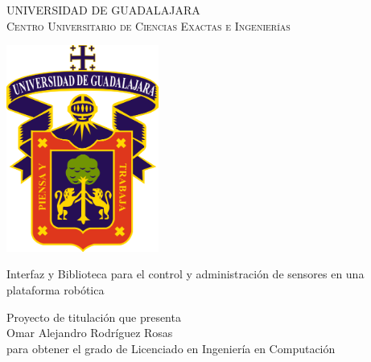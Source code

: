 \documentclass[letterpaper,openright,12pt]{book}
\newcommand{\HRule}{\rule{\linewidth}{0.5mm}}
\begin{document}




\begin{titlepage}
\begin{center}
\vfill
{\Large  UNIVERSIDAD DE GUADALAJARA}\\[0.2cm]
\textsc{\large Centro Universitario de Ciencias Exactas e Ingenierí­as}\\[1cm]
\end{center}

\begin{center}
\includegraphics[width=5cm]{figures/escudo.png}
\end{center}

\begin{center}
\Large Interfaz y Biblioteca para el control y administración de sensores en una plataforma robótica \\[0.2cm]
\end{center}


\begin{center}
{\normalsize Proyecto de titulación que presenta}\\[0.4cm]
{\Large Omar Alejandro Rodríguez Rosas}\\[0.4cm]
{\normalsize para obtener el grado de Licenciado en Ingeniería en Computación\\[0.4cm]}
\end{center}


\end{titlepage}
\end{document}
